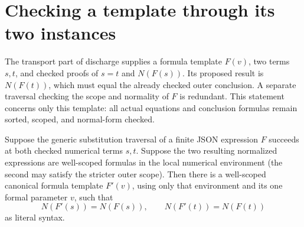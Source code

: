 \section{Checking a template through its two instances}
\label{sec:template-completion}

The transport part of discharge supplies a formula template $F(v)$,
two terms $s,t$, and checked proofs of $s=t$ and $N(F(s))$.
Its proposed result is $N(F(t))$, which must equal the already checked
outer conclusion.  A separate traversal checking the scope and normality
of $F$ is redundant.  This statement concerns only this template: all
actual equations and conclusion formulas remain sorted, scoped, and
normal-form checked.

\begin{lemma}
Suppose the generic substitution traversal of a finite JSON expression
$F$ succeeds at both checked numerical terms $s,t$.  Suppose the two
resulting normalized expressions are well-scoped formulas in the local
numerical environment (the second may satisfy the stricter outer scope).
Then there is a well-scoped canonical formula template $F'(v)$, using
only that environment and its one formal parameter $v$, such that
\[
                  N(F'(s))=N(F(s)),\qquad
                  N(F'(t))=N(F(t))
\]
as literal syntax.
\end{lemma}

